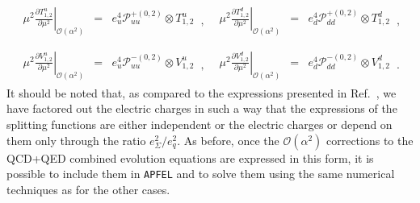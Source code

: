 \begin{equation}
\begin{array}{ll}
\begin{array}{rcl}
\displaystyle \left.\mu^2\frac{\partial T^u_{1,2}}{\partial \mu^2}\right|_{\mathcal{O}(\alpha^2)} &=&
\displaystyle e_u^4\mathcal{P}_{uu}^{+(0,2)}\otimes T^u_{1,2}
\end{array}\,, &
\begin{array}{rcl}
\displaystyle \left.\mu^2\frac{\partial T^d_{1,2}}{\partial \mu^2}\right|_{\mathcal{O}(\alpha^2)} &=&
\displaystyle e_d^4\mathcal{P}_{dd}^{+(0,2)} \otimes T^d_{1,2}
\end{array}\,,
\\
\\
\begin{array}{rcl}
\displaystyle \left.\mu^2\frac{\partial V^u_{1,2}}{\partial \mu^2}\right|_{\mathcal{O}(\alpha^2)} &=&
\displaystyle e_u^4\mathcal{P}_{uu}^{-(0,2)} \otimes V^u_{1,2}
\end{array}\,, &
\begin{array}{rcl}
\displaystyle \left.\mu^2\frac{\partial V^d_{1,2}}{\partial \mu^2}\right|_{\mathcal{O}(\alpha^2)} &=&
\displaystyle e_d^4\mathcal{P}_{dd}^{-(0,2)}\otimes V^d_{1,2}
\end{array}\,.
\end{array}
\end{equation}
It should be noted that, as compared to the expressions presented in
Ref.~\cite{deFlorian:2016gvk}, we have factored out the electric
charges in such a way that the expressions of the splitting
functions are either independent or the electric charges or depend
on them
only through the ratio $e_\Sigma^2/e_q^2$.
%
As before, once the $\mathcal{O}(\alpha^2)$ corrections
to the QCD+QED combined evolution equations are
expressed in this form, it is possible to include
them in {\tt APFEL} and to solve them using the
same numerical techniques as for the other
cases.

